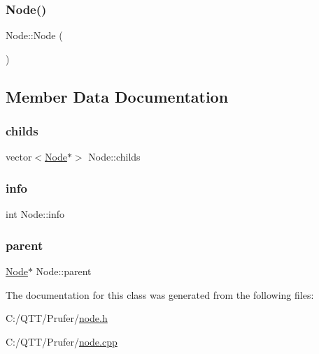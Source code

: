 \mbox{\label{class_node_ad7a34779cad45d997bfd6d3d8043c75f}} 
\subsubsection{\texorpdfstring{Node()}{Node()}\hspace{0.1cm}{\footnotesize\ttfamily [2/2]}}
{\footnotesize\ttfamily Node\+::\+Node (\begin{DoxyParamCaption}{ }\end{DoxyParamCaption})}



\subsection{Member Data Documentation}
\mbox{\label{class_node_acc82c6348fd723e07aaf27bda5c2ea8a}} 
\subsubsection{\texorpdfstring{childs}{childs}}
{\footnotesize\ttfamily vector$<$\mbox{\hyperlink{class_node}{Node}}$\ast$$>$ Node\+::childs}

\mbox{\label{class_node_a9d0627058327302f27c2b8e3b69bcf72}} 
\subsubsection{\texorpdfstring{info}{info}}
{\footnotesize\ttfamily int Node\+::info}

\mbox{\label{class_node_ad8184598cdea70e4bbdfd76f2b0f9e85}} 
\subsubsection{\texorpdfstring{parent}{parent}}
{\footnotesize\ttfamily \mbox{\hyperlink{class_node}{Node}}$\ast$ Node\+::parent}



The documentation for this class was generated from the following files\+:\begin{DoxyCompactItemize}
\item 
C\+:/\+Q\+T\+T/\+Prufer/\mbox{\hyperlink{node_8h}{node.\+h}}\item 
C\+:/\+Q\+T\+T/\+Prufer/\mbox{\hyperlink{node_8cpp}{node.\+cpp}}\end{DoxyCompactItemize}
